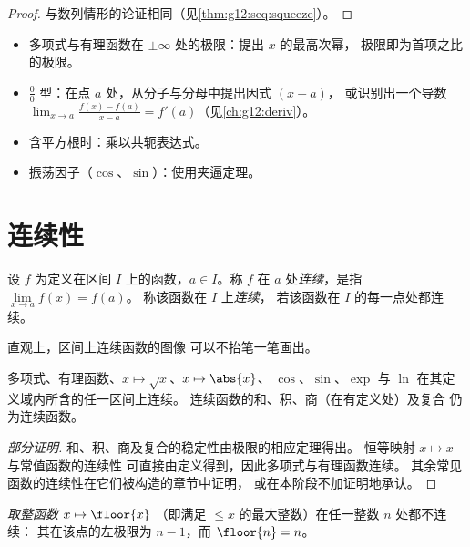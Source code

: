 \begin{proof}
与数列情形的论证相同（见\cref{thm:g12:seq:squeeze}）。
\end{proof}

\begin{method}[极限的计算方法]\label{met:g12:limcont:limits}
\begin{itemize}
  \item 多项式与有理函数在 $\pm\infty$ 处的极限：提出
        $x$ 的最高次幂，
        极限即为首项之比的极限。
  \item $\frac{0}{0}$ 型：在点 $a$ 处，从分子与分母中提出因式 $(x-a)$，
        或识别出一个导数
        $\lim_{x\to a}\frac{f(x)-f(a)}{x-a} = f'(a)$（见\cref{ch:g12:deriv}）。
  \item 含平方根时：乘以共轭表达式。
  \item 振荡因子（$\cos$、$\sin$）：使用夹逼定理。
\end{itemize}
\end{method}

\section{连续性}

\begin{definition}[连续性]\label{def:g12:limcont:continuity}
设 $f$ 为定义在区间 $I$ 上的函数，$a \in I$。称 $f$ 在
$a$ 处\emph{连续}，是指 $\lim\limits_{x \to a} f(x) = f(a)$。
称该函数在 $I$ 上\emph{连续}，
若该函数在 $I$ 的每一点处都连续。
\end{definition}

直观上，区间上连续函数的图像
可以不抬笔一笔画出。

\begin{proposition}[常见函数的连续性]\label{prop:g12:limcont:usual}
多项式、有理函数、$x \mapsto \sqrt{x}$、$x \mapsto \abs{x}$、
$\cos$、$\sin$、$\exp$ 与 $\ln$ 在其定义域内所含的任一区间上连续。
连续函数的和、积、商（在有定义处）及复合
仍为连续函数。
\end{proposition}

\begin{proof}[部分证明]
和、积、商及复合的稳定性由极限的相应定理得出。
恒等映射 $x \mapsto x$ 与常值函数的连续性
可直接由定义得到，因此多项式与有理函数连续。
其余常见函数的连续性在它们被构造的章节中证明，
或在本阶段不加证明地承认。
\end{proof}

\begin{example}
\emph{取整函数} $x \mapsto \floor{x}$
（即满足 $\leq x$ 的最大整数）在任一整数 $n$ 处都不连续：
其在该点的左极限为 $n - 1$，而 $\floor{n} = n$。
\end{example}

